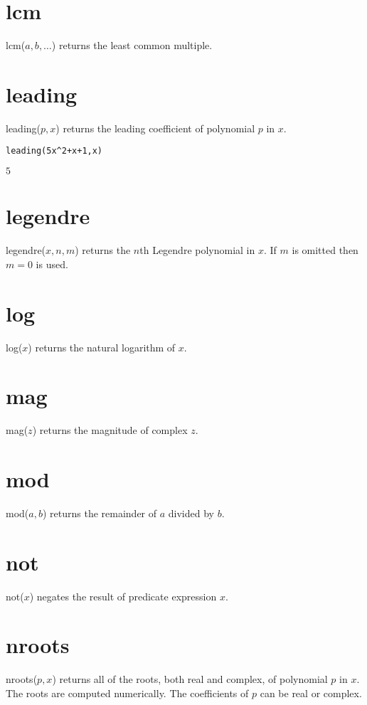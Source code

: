 \section*{lcm}
lcm($a,b,\ldots$) returns the least common multiple.

\section*{leading}
leading($p,x$) returns the leading coefficient of polynomial $p$ in $x$.

\begin{Verbatim}[formatcom=\color{blue},samepage=true]
leading(5x^2+x+1,x)
\end{Verbatim}

$\displaystyle 5$

\section*{legendre}
legendre($x,n,m$) returns the $n$th Legendre polynomial in $x$.
If $m$ is omitted then $m=0$ is used.

\section*{log}
log($x$) returns the natural logarithm of $x$.

\section*{mag}
mag($z$) returns the magnitude of complex $z$.

\section*{mod}
mod($a,b$) returns the remainder of $a$ divided by $b$.

\section*{not}
not($x$) negates the result of predicate expression $x$.

\section*{nroots}
nroots($p,x$) returns all of the roots, both real and complex, of
polynomial $p$ in $x$.
The roots are computed numerically.
The coefficients of $p$ can be real or complex.

